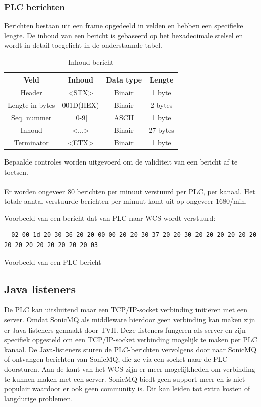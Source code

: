 \subsubsection{PLC berichten}
Berichten bestaan uit een frame opgedeeld in velden en hebben een specifieke lengte.
De inhoud van een bericht is gebaseerd op het hexadecimale stelsel en wordt in detail toegelicht in de onderstaande tabel.
\begin{table}[h!]
\centering 
\begin{tabular}{|c|c|c|c|}
  \hline
  \textbf{Veld} & \textbf{Inhoud} & \textbf{Data type} & \textbf{Lengte} \\
  \hline 
  Header & <STX> & Binair & 1 byte \\
  \hline 
  Lengte in bytes & 001D(HEX) & Binair & 2 bytes \\
  \hline 
  Seq. nummer &  [0-9] & ASCII & 1 byte  \\
  \hline 
  Inhoud & <...> & Binair & 27 bytes \\
  \hline 
  Terminator & <ETX> & Binair & 1 byte \\
  \hline
\end{tabular}
\caption[Message content]{\label{tab:message-content}Inhoud bericht}
\end{table}

Bepaalde controles worden uitgevoerd om de validiteit van een bericht af te toetsen. 
\\\\
Er worden ongeveer 80 berichten per minuut verstuurd per PLC, per kanaal.
Het totale aantal verstuurde berichten per minuut komt uit op ongeveer 1680/min.

Voorbeeld van een bericht dat van PLC naar WCS wordt verstuurd: 
\begin{listing}[h!]
\begin{verbatim}
  02 00 1d 20 30 36 20 20 00 00 20 20 30 37 20 20 30 20 20 20 20 20 20 20 20 20 20 20 20 20 20 03
\end{verbatim}
\caption[Voorbeeld PLC bericht]{\label{listing:message_example}Voorbeeld van een PLC bericht}
\end{listing}

\subsection{Java listeners}
De PLC kan uitsluitend maar een TCP/IP-socket verbinding initiëren met een server.
Omdat SonicMQ als middleware hierdoor geen verbinding kan maken zijn er Java-listeners gemaakt door TVH.
Deze listeners fungeren als server en zijn specifiek opgesteld om een TCP/IP-socket verbinding mogelijk te maken per PLC kanaal.
De Java-listeners sturen de PLC-berichten vervolgens door naar SonicMQ of ontvangen berichten van SonicMQ, 
die ze via een socket naar de PLC doorsturen.
Aan de kant van het WCS zijn er meer mogelijkheden om verbinding te kunnen maken met een server.
SonicMQ biedt geen support meer en is niet populair waardoor er ook geen community is.
Dit kan leiden tot extra kosten of langdurige problemen.

